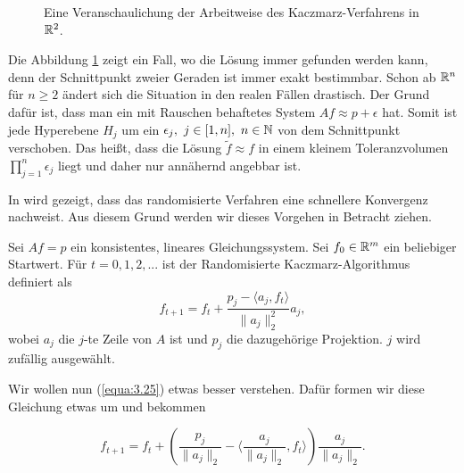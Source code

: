 \begin{figure}[H]
	\caption{Eine Veranschaulichung der Arbeitweise des Kaczmarz-Verfahrens in $\mathbb{R}^2$.}
	\label{fig:3.10}
\end{figure}

\begin{Bemerkung}
	Die Abbildung \ref{fig:3.10} zeigt ein Fall, wo die Lösung immer gefunden werden kann, denn der Schnittpunkt zweier Geraden ist immer exakt bestimmbar. Schon ab $\mathbb{R}^n$ für $n \geq 2$ ändert sich die Situation in den realen Fällen drastisch. Der Grund dafür ist, dass man ein mit Rauschen behaftetes System $Af \approx p + \epsilon$ hat. Somit ist jede Hyperebene $H_j$ um ein $\epsilon_j, \ j \in [1, n], \ n \in \mathbb{N}$ von dem Schnittpunkt verschoben. Das heißt, dass die Lösung $\tilde{f} \approx f$ in einem kleinem Toleranzvolumen $\prod \limits_{j=1}^{n}\epsilon_j$ liegt und daher nur annähernd angebbar ist.
	\label{be.:11}
\end{Bemerkung}

In \cite{Neufeld15} wird gezeigt, dass das randomisierte Verfahren eine schnellere Konvergenz nachweist. Aus diesem Grund werden wir dieses Vorgehen in Betracht ziehen. 
\begin{Definition}
	Sei $Af = p$ ein konsistentes, lineares Gleichungssystem. Sei $f_0 \in \mathbb{R}^m$ ein beliebiger Startwert. Für $t = 0, 1, 2, ...$ ist der Randomisierte Kaczmarz-Algorithmus definiert als
	\begin{equation}
			f_{t+1} = f_t + \frac{p_j - \langle a_j, f_t \rangle}{\parallel a_j \parallel_{2}^{2}}a_j,
			\label{equa:3.25}
	\end{equation}
	wobei $a_j$ die $j$-te Zeile von $A$ ist und $p_j$ die dazugehörige Projektion. $j$ wird zufällig ausgewählt.
	\label{def:5}	
\end{Definition} 
Wir wollen nun (\ref{equa:3.25}) etwas besser verstehen. Dafür formen wir diese Gleichung etwas um und bekommen

\[f_{t+1} = f_t + \left( \frac{p_j}{\parallel a_j \parallel_{2}} - \langle \frac{a_j}{\parallel a_j \parallel_{2}}, f_t \rangle \right) \frac{a_j}{\parallel a_j \parallel_{2}}.\]

